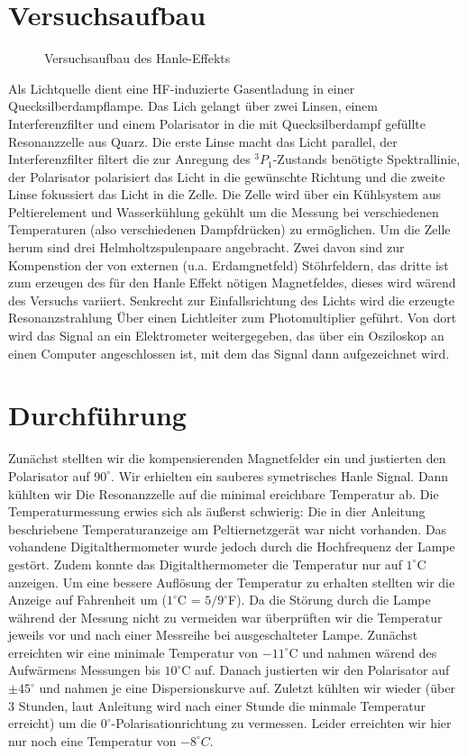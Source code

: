 \documentclass[12pt]{article}
\begin{document}
\section{Versuchsaufbau}
\begin{figure}[H]  
\centering
\caption{Versuchsaufbau des Hanle-Effekts}
\end{figure}

Als Lichtquelle dient eine HF-induzierte Gasentladung in einer Quecksilberdampflampe. Das Lich gelangt über zwei Linsen, 
einem Interferenzfilter und einem Polarisator in die mit Quecksilberdampf gefüllte Resonanzzelle aus Quarz. Die erste Linse 
macht das Licht parallel, der Interferenzfilter filtert die zur Anregung des $^3P_1$-Zustands benötigte Spektrallinie, der 
Polarisator polarisiert das Licht in die gewünschte Richtung und die zweite Linse fokussiert das Licht in die Zelle. Die Zelle
wird über ein Kühlsystem aus Peltierelement und Wasserkühlung gekühlt um die Messung bei verschiedenen Temperaturen (also
verschiedenen Dampfdrücken) zu ermöglichen. Um die Zelle herum sind drei Helmholtzspulenpaare angebracht. Zwei davon sind
zur Kompenstion der von externen (u.a. Erdamgnetfeld) Stöhrfeldern, das dritte ist zum erzeugen des für den Hanle Effekt 
nötigen Magnetfeldes, dieses wird wärend des Versuchs variiert. Senkrecht zur Einfallsrichtung des Lichts wird die erzeugte
Resonanzstrahlung Über einen Lichtleiter zum Photomultiplier geführt. Von dort wird das Signal an ein Elektrometer
weitergegeben, das über ein Osziloskop an einen Computer angeschlossen ist, mit dem das Signal dann aufgezeichnet wird.
\newpage

\section{Durchführung}
Zunächst stellten wir die kompensierenden Magnetfelder ein und justierten den Polarisator auf $90^\circ$. Wir erhielten
ein sauberes symetrisches Hanle Signal. Dann kühlten wir Die Resonanzzelle auf die minimal ereichbare Temperatur ab. Die
Temperaturmessung erwies sich als äußerst schwierig: Die in dier Anleitung beschriebene Temperaturanzeige am Peltiernetzgerät
war nicht vorhanden. Das vohandene Digitalthermometer wurde jedoch durch die Hochfrequenz der Lampe gestört. Zudem konnte das
Digitalthermometer die Temperatur nur auf $1^\circ$C anzeigen. Um eine bessere Auflösung der Temperatur zu erhalten stellten wir
die Anzeige auf Fahrenheit um ($1^\circ$C = $5/9^\circ$F). Da die Störung durch die Lampe während der Messung nicht zu vermeiden
war überprüften wir die Temperatur jeweils vor und nach einer Messreihe bei ausgeschalteter Lampe. Zunächst erreichten wir eine
minimale Temperatur von $-11^\circ$C und nahmen wärend des Aufwärmens Messungen bis $10^\circ$C auf. Danach justierten wir den
Polarisator auf $\pm 45^\circ$ und nahmen je eine Dispersionskurve auf. Zuletzt kühlten wir wieder (über 3 Stunden, laut Anleitung wird
nach einer Stunde die minmale Temperatur erreicht) um die $0^\circ$-Polarisationrichtung zu vermessen. Leider erreichten
wir hier nur noch eine Temperatur von $-8^\circ C$. 
\end{document}
